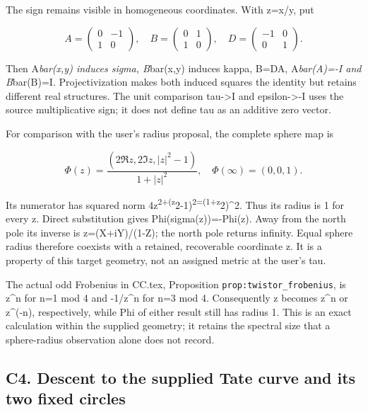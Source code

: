 \documentclass[
]{article}
\begin{document}
The sign remains visible in homogeneous coordinates. With z=x/y, put

\[
A=\begin{pmatrix}0&-1\\1&0\end{pmatrix},\quad
B=\begin{pmatrix}0&1\\1&0\end{pmatrix},\quad
D=\begin{pmatrix}-1&0\\0&1\end{pmatrix}.
\tag{C3.3}
\]

Then A\emph{bar(x,y) induces sigma, B}bar(x,y) induces kappa, B=DA,
A\emph{bar(A)=-I and B}bar(B)=I. Projectivization makes both induced
squares the identity but retains different real structures. The unit
comparison tau-\textgreater I and epsilon-\textgreater-I uses the source
multiplicative sign; it does not define tau as an additive zero vector.

For comparison with the user's radius proposal, the complete sphere map
is

\[
\Phi(z)=\frac{(2\Re z,2\Im z,|z|^2-1)}{1+|z|^2},\quad
\Phi(\infty)=(0,0,1).
\tag{C3.4}
\]

Its numerator has squared norm
4\textbar z\textbar{}\textsuperscript{2+(\textbar z\textbar{}}2-1)\textsuperscript{2=(1+\textbar z\textbar{}}2)\^{}2.
Thus its radius is 1 for every z. Direct substitution gives
Phi(sigma(z))=-Phi(z). Away from the north pole its inverse is
z=(X+iY)/(1-Z); the north pole returns infinity. Equal sphere radius
therefore coexists with a retained, recoverable coordinate
\textbar z\textbar. It is a property of this target geometry, not an
assigned metric at the user's tau.

The actual odd Frobenius in CC.tex, Proposition
\texttt{prop:twistor\_frobenius}, is z\^{}n for n=1 mod 4 and -1/z\^{}n
for n=3 mod 4. Consequently \textbar z\textbar{} becomes
\textbar z\textbar\^{}n or \textbar z\textbar\^{}(-n), respectively,
while Phi of either result still has radius 1. This is an exact
calculation within the supplied geometry; it retains the spectral size
that a sphere-radius observation alone does not record.

\subsection{C4. Descent to the supplied Tate curve and its two fixed
circles}\label{c4.-descent-to-the-supplied-tate-curve-and-its-two-fixed-circles}
\end{document}
